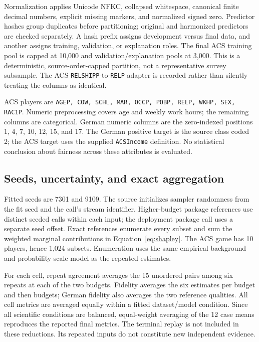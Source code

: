 \documentclass{article}
\begin{document}
Normalization applies Unicode NFKC, collapsed whitespace, canonical finite decimal numbers, explicit missing markers, and normalized signed zero. Predictor hashes group duplicates before partitioning; original and harmonized predictors are checked separately. A hash prefix assigns development versus final data, and another assigns training, validation, or explanation roles. The final ACS training pool is capped at 10,000 and validation/explanation pools at 3,000. This is a deterministic, source-order-capped partition, not a representative survey subsample. The ACS \texttt{RELSHIPP}-to-\texttt{RELP} adapter is recorded rather than silently treating the columns as identical.

ACS players are \texttt{AGEP, COW, SCHL, MAR, OCCP, POBP, RELP, WKHP, SEX, RAC1P}. Numeric preprocessing covers age and weekly work hours; the remaining columns are categorical. German numeric columns are the zero-indexed positions 1, 4, 7, 10, 12, 15, and 17. The German positive target is the source class coded 2; the ACS target uses the supplied \texttt{ACSIncome} definition. No statistical conclusion about fairness across these attributes is evaluated.

\subsection{Seeds, uncertainty, and exact aggregation}
Fitted seeds are 7301 and 9109. The source initializes sampler randomness from the fit seed and the call's stream identifier. Higher-budget package references use distinct seeded calls within each input; the deployment package call uses a separate seed offset. Exact references enumerate every subset and sum the weighted marginal contributions in Equation~\ref{eq:shapley}. The ACS game has 10 players, hence 1,024 subsets. Enumeration uses the same empirical background and probability-scale model as the repeated estimates.

For each cell, repeat agreement averages the 15 unordered pairs among six repeats at each of the two budgets. Fidelity averages the six estimates per budget and then budgets; German fidelity also averages the two reference qualities. All cell metrics are averaged equally within a fitted dataset/model condition. Since all scientific conditions are balanced, equal-weight averaging of the 12 case means reproduces the reported final metrics. The terminal replay is not included in these reductions. Its repeated inputs do not constitute new independent evidence.
\end{document}
